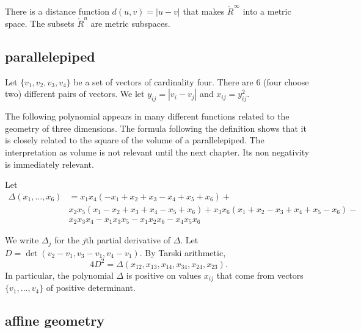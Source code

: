 There is a distance function $d(u,v) = | u - v|$ that makes
$\ring{R}^\infty$ into a metric space.  The subsets $\ring{R}^n$ are
metric subspaces.






\subsection{parallelepiped}

Let $\{v_1,v_2,v_3,v_4\}$ be a set of vectors of cardinality four.
There are $6$ (four choose two) different pairs of vectors. We let
$y_{ij} = |v_i-v_j|$ and $x_{ij}=y_{ij}^2$.

The following polynomial appears in many different functions related to the geometry of three dimensions.  The formula following the definition shows that it is closely related to the square of the volume of a parallelepiped.  The interpretation as  volume is not relevant until the next chapter.  Its non negativity is immediately relevant. 

\begin{definition}[$\Delta$]\label{def:delta}  Let 
$$
\begin{array}{lll}
\Delta(x_1,\ldots,x_6) &= x_1 x_4 (- x_1+x_2+x_3- x_4+x_5+x_6)+\\&
            x_2 x_5 (x_1- x_2+x_3+x_4- x_5+x_6)
            +x_3 x_6 (x_1+x_2- x_3+x_4+x_5- x_6)
            - \\&x_2 x_3 x_4- x_1 x_3 x_5- x_1 x_2 x_6- x_4 x_5 x_6
\end{array}
$$
\end{definition}

We write $\Delta_j$ for the $j$th partial derivative of $\Delta$. 
Let $D = \det(v_2-v_1,v_3-v_1,v_4-v_1)$.
By Tarski arithmetic, 
  $$
  4 D^2 = \Delta(x_{12},x_{13},x_{14},x_{34},x_{24},x_{23}).
  $$
In particular, the polynomial $\Delta$ is positive on values $x_{ij}$
that come from vectors $\{v_1,\ldots,v_4\}$ of positive determinant.





\subsection{affine geometry}



